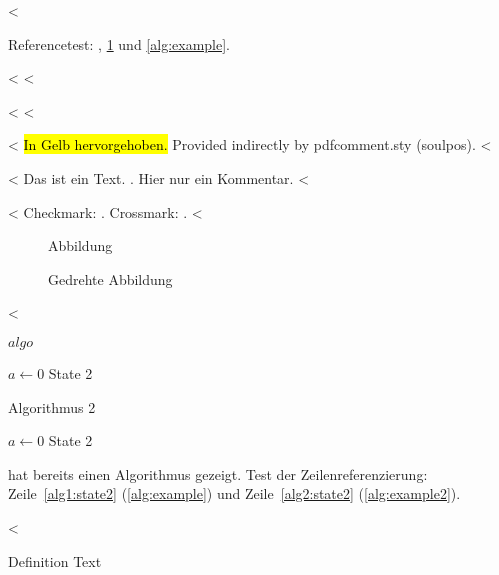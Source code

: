 <%
\label{ssec:example}

Referencetest: , \cref{fig:Abbildung} und \cref{alg:example}.

<%
<%

<%
<%

<%
\hl{In Gelb hervorgehoben.}
Provided indirectly by pdfcomment.sty (soulpos).
<%

<%
Das ist ein Text.
.
Hier nur ein Kommentar.
<%

<%
Checkmark: \dingcheck. Crossmark: \dingcross.
<%

\begin{figure}
  \missingfigure{}
  \caption{Abbildung}
  \label{fig:Abbildung}
\end{figure}

\begin{landscape}
  \begin{figure}
    \missingfigure{}
    \caption{Gedrehte Abbildung}
    \label{fig:AbbildungGedreht}
  \end{figure}
\end{landscape}

<%

\begin{algorithm}
  \caption{$algo$}
  \label{alg:example}
  \begin{algorithmic}[1]
    \State $a \gets 0$
    \State State 2\label{alg1:state2}
  \end{algorithmic}
\end{algorithm}

\begin{algorithm}
\caption{Algorithmus 2}
\label{alg:example2}
\begin{algorithmic}[1]
\State $a \gets 0$
\State State 2\label{alg2:state2}
\end{algorithmic}
\end{algorithm}

 hat bereits einen Algorithmus gezeigt.
Test der Zeilenreferenzierung: Zeile~\ref{alg1:state2} (\cref{alg:example}) und Zeile~\ref{alg2:state2} (\cref{alg:example2}).

<%
\begin{definition}[Title]
\label{def:def1}
Definition Text
\end{definition}

